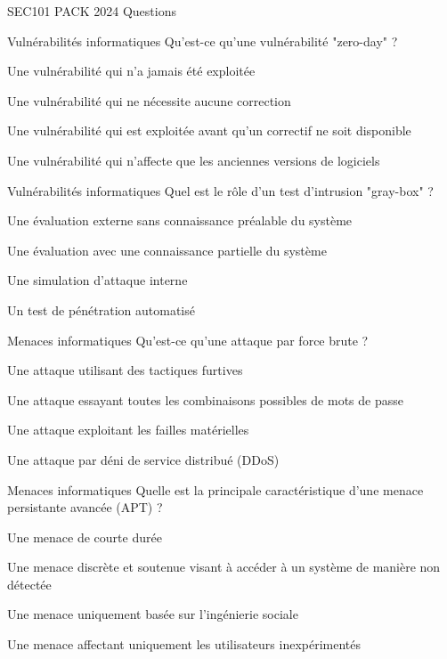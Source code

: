 \documentclass[12pt]{article}
\begin{document}
\begin{quiz}{SEC101 PACK 2024 Questions}
\begin{multi}[points=1]{Vulnérabilités informatiques}
Qu'est-ce qu'une vulnérabilité "zero-day" ?
    \item Une vulnérabilité qui n'a jamais été exploitée
    \item Une vulnérabilité qui ne nécessite aucune correction
    \item *Une vulnérabilité qui est exploitée avant qu'un correctif ne soit disponible
    \item Une vulnérabilité qui n'affecte que les anciennes versions de logiciels
\end{multi}

\begin{multi}[points=1]{Vulnérabilités informatiques}
Quel est le rôle d'un test d'intrusion "gray-box" ?
    \item Une évaluation externe sans connaissance préalable du système
    \item *Une évaluation avec une connaissance partielle du système
    \item Une simulation d'attaque interne
    \item Un test de pénétration automatisé
\end{multi}

\begin{multi}[points=1]{Menaces informatiques}
Qu'est-ce qu'une attaque par force brute ?
    \item Une attaque utilisant des tactiques furtives
    \item *Une attaque essayant toutes les combinaisons possibles de mots de passe
    \item Une attaque exploitant les failles matérielles
    \item Une attaque par déni de service distribué (DDoS)
\end{multi}

\begin{multi}[points=1]{Menaces informatiques}
Quelle est la principale caractéristique d'une menace persistante avancée (APT) ?
    \item Une menace de courte durée
    \item *Une menace discrète et soutenue visant à accéder à un système de manière non détectée
    \item Une menace uniquement basée sur l'ingénierie sociale
    \item Une menace affectant uniquement les utilisateurs inexpérimentés
\end{multi}


\end{quiz}
\end{document}
